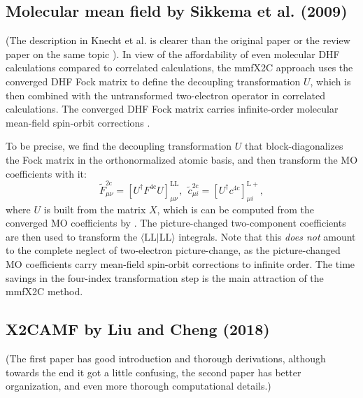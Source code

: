 \documentclass{article}
\begin{document}
\subsection{Molecular mean field by Sikkema et al. (2009)}
(The description in Knecht et al. \cite{knechtExactTwocomponentHamiltonians2022} is clearer than the original paper \cite{sikkemaMolecularMeanfieldApproach2009} or the review paper on the same topic \cite{saueRelativisticHamiltoniansChemistry2011}). In view of the affordability of even molecular DHF calculations compared to correlated calculations, the mmfX2C approach uses the converged DHF Fock matrix to define the decoupling transformation $U$, which is then combined with the untransformed two-electron operator in correlated calculations. The converged DHF Fock matrix carries infinite-order molecular mean-field spin-orbit corrections \cite{liuInfiniteorderQuasirelativisticDensity2006,pengMakingFourTwocomponent2007}.

To be precise, we find the decoupling transformation $U$ that block-diagonalizes the Fock matrix in the orthonormalized atomic basis, and then transform the MO coefficients with it:
\begin{equation}
    \tilde{F}_{\mu\nu}^{\mathrm{2c}}=\left[U^{\dagger}F^{\mathrm{4c}}U  \right]_{\mu\nu}^{\mathrm{LL}},\ \ \tilde{c}_{\mu i}^{\mathrm{2c}}=\left[ U^{\dagger}c^{\mathrm{4c}} \right]_{\mu i}^{\mathrm{L}+},
\end{equation}
where $U$ is built from the matrix $X$, which is can be computed from the converged MO coefficients by . The picture-changed two-component coefficients are then used to transform the $\langle \mathrm{LL}|\mathrm{LL}\rangle$ integrals. Note that this \textit{does not} amount to the complete neglect of two-electron picture-change, as the picture-changed MO coefficients carry mean-field spin-orbit corrections to infinite order. The time savings in the four-index transformation step is the main attraction of the mmfX2C method.

\subsection{X2CAMF by Liu and Cheng (2018)}
(The first paper \cite{liuAtomicMeanfieldSpinorbit2018} has good introduction and thorough derivations, although towards the end it got a little confusing, the second paper \cite{zhangAtomicMeanFieldApproach2022} has better organization, and even more thorough computational details.)
\end{document}
